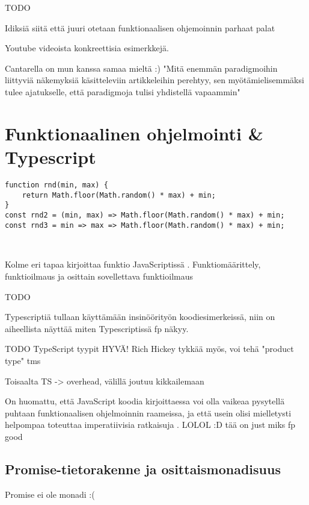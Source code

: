 TODO

Idiksiä siitä että juuri otetaan funktionaalisen ohjemoinnin parhaat palat

Youtube videoista konkreettisia esimerkkejä.

Cantarella on mun kanssa samaa mieltä :) "Mitä enemmän paradigmoihin liittyviä näkemyksiä käsitteleviin artikkeleihin perehtyy, sen myötämielisemmäksi tulee ajatukselle, että paradigmoja tulisi yhdistellä vapaammin"  \cite[45]{cantarella_fp_haitat}

\section{Funktionaalinen ohjelmointi \& Typescript}


\begin{code}
	\begin{verbatim}
function rnd(min, max) { 
	return Math.floor(Math.random() * max) + min;
}
const rnd2 = (min, max) => Math.floor(Math.random() * max) + min;
const rnd3 = min => max => Math.floor(Math.random() * max) + min;



\end{verbatim}
	\caption{Kolme eri tapaa kirjoittaa funktio JavaScriptissä \cite{okhravi-g-discussion}. Funktiomäärittely, funktioilmaus ja osittain sovellettava funktioilmaus}
	\label{code:javascript_function_types}
\end{code}


TODO

Typescriptiä tullaan käyttämään insinöörityön koodiesimerkeissä, niin on aiheellista näyttää miten Typescriptissä \gls{fp} näkyy.

TODO TypeScript tyypit HYVÄ! Rich Hickey tykkää myös, voi tehä "product type" tms

Toisaalta TS -> overhead, välillä joutuu kikkailemaan

On huomattu, että JavaScript koodia kirjoittaessa voi olla vaikeaa pysytellä puhtaan funktionaalisen ohjelmoinnin raameissa, ja että usein olisi mielletysti helpompaa toteuttaa imperatiivisia ratkaisuja \cite[44]{cantarella_fp_haitat}.  LOLOL :D tää on just miks fp good

\subsection{Promise-tietorakenne ja osittaismonadisuus}

Promise ei ole monadi :( \cite{read-it-later-11481,promises-spec-94}

